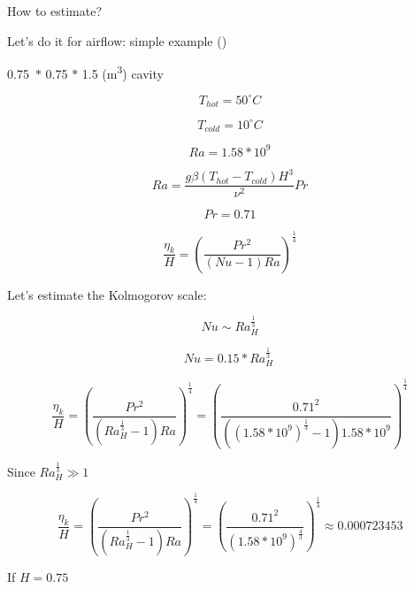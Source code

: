 \documentclass[12pt]{article}
\renewcommand{\_}{\kern-1.5pt\textunderscore\kern-1.5pt}
\begin{document}

\par

How to estimate?\par

Let’s do it for airflow: simple example (\cite{Ampofo2003})\par

0.75\ $\ast$  0.75 $\ast$  1.5  (m\textsuperscript{3}) cavity\par

 \[ T_{hot}=50 ^{\circ}C  \] \par

 \[ T_{cold}=10 ^{\circ}C  \] \par

 \[ Ra=1.58\ast10^{9} \] \par

 \[ Ra=\frac{g \beta  \left( T_{hot}-T_{cold} \right) H^{3}}{ \nu ^{2}}Pr \] \par

 \[ Pr=0.71 \] \par

 \[ \frac{ \eta _{k}}{H}= \left( \frac{Pr^{2}}{ \left( Nu-1 \right) Ra} \right) ^{\frac{1}{4}} \] \par

Let’s estimate the Kolmogorov scale:\par

 \[ Nu \sim Ra_{H}^{\frac{1}{3}} \] \par

 \[ Nu=0.15\ast{Ra}_{H}^{\frac{1}{3}}~ \] \par

 \[ \frac{ \eta _{k}}{H}= \left( \frac{Pr^{2}}{ \left( Ra_{H}^{\frac{1}{3}}-1 \right) Ra} \right) ^{\frac{1}{4}}= \left( \frac{0.71^{2}}{ \left(  \left( 1.58\ast10^{9} \right) ^{\frac{1}{3}}-1 \right) 1.58\ast10^{9}} \right) ^{\frac{1}{4}} \] \par

Since  \( Ra_{H}^{\frac{1}{3}} \gg 1 \) \par

 \[ \frac{ \eta _{k}}{H}= \left( \frac{Pr^{2}}{ \left( Ra_{H}^{\frac{1}{3}}-1 \right) Ra} \right) ^{\frac{1}{4}}= \left( \frac{0.71^{2}}{ \left( 1.58\ast10^{9} \right) ^{\frac{4}{3}}} \right) ^{\frac{1}{4}} \approx 0.000723453 \] \par

If  \( H=0.75 \) \par
\end{document}
